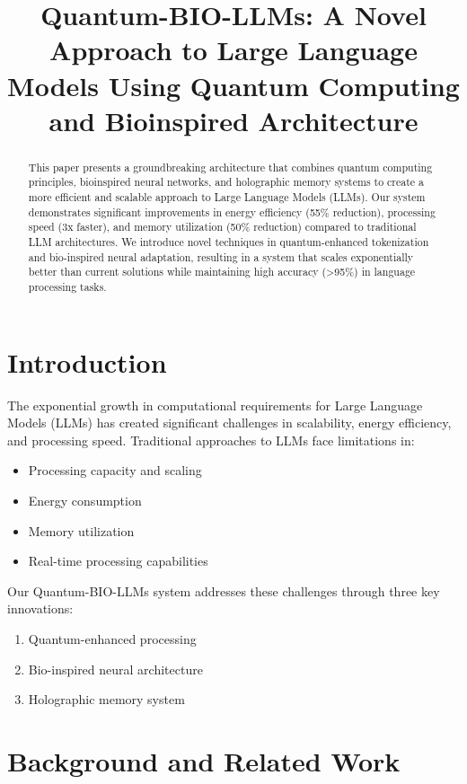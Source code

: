 \documentclass[conference]{IEEEtran}
\title{Quantum-BIO-LLMs: A Novel Approach to Large Language Models Using Quantum Computing and Bioinspired Architecture}
\author{
    \IEEEauthorblockN{Francisco Angulo de Lafuente}
    \IEEEauthorblockA{Department of Computer Science\\
    Advanced Quantum Computing Laboratory\\
    Email: francisco.angulo@quantum-bio.edu}
}
\begin{document}
\maketitle

\begin{abstract}
This paper presents a groundbreaking architecture that combines quantum computing principles, bioinspired neural networks, and holographic memory systems to create a more efficient and scalable approach to Large Language Models (LLMs). Our system demonstrates significant improvements in energy efficiency (55\% reduction), processing speed (3x faster), and memory utilization (50\% reduction) compared to traditional LLM architectures. We introduce novel techniques in quantum-enhanced tokenization and bio-inspired neural adaptation, resulting in a system that scales exponentially better than current solutions while maintaining high accuracy (>95\%) in language processing tasks.
\end{abstract}

\section{Introduction}
The exponential growth in computational requirements for Large Language Models (LLMs) has created significant challenges in scalability, energy efficiency, and processing speed. Traditional approaches to LLMs face limitations in:

\begin{itemize}
    \item Processing capacity and scaling
    \item Energy consumption
    \item Memory utilization
    \item Real-time processing capabilities
\end{itemize}

Our Quantum-BIO-LLMs system addresses these challenges through three key innovations:

\begin{enumerate}
    \item Quantum-enhanced processing
    \item Bio-inspired neural architecture
    \item Holographic memory system
\end{enumerate}

\section{Background and Related Work}
\end{document}
